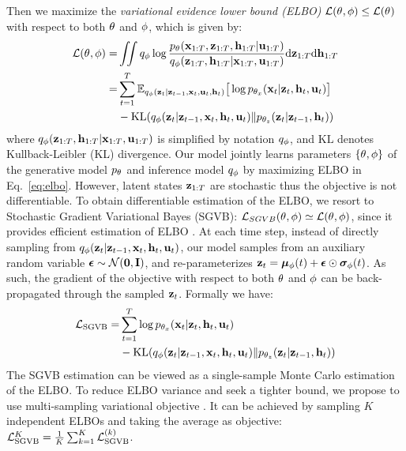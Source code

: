 \documentclass{article}
\begin{document}
Then we maximize the \textit{variational evidence lower bound (ELBO)} $\mcL(\bt, \bphi)\le\mcL(\bt)$~\cite{jordan1999introduction} with respect to both $\bt$ and $\bphi$, which is given by:
\begin{equation}\label{eq:elbo}
\begin{split}
    \mcL(\bt, \bphi) 
    =& \iint \qPhi\log
    \frac{\pT(\bx_{1:T}, \bz_{1:T}, \bh_{1:T}|\bu_{1:T})}{\qPhi(\bz_{1:T}, \bh_{1:T}|\bx_{1:T},\bu_{1:T})}\mathrm{d}\bz_{1:T}\mathrm{d}\bh_{1:T}\\
    =&\sum_{t=1}^{T}\mathbb{E}_{\qPhi(\bz_t|\bz_{t-1},\bx_t,\bu_t,\bh_t)}\big[\log \pT[x](\bx_t|\bz_t,\bh_t,\bu_t)\big]\\
    &- \text{KL}(\qPhi(\bz_t|\bz_{t-1},\bx_t,\bh_t, \bu_t)\rVert\pT[z](\bz_t|\bz_{t-1},\bh_t))
\end{split}
\end{equation}
where $\qPhi(\bz_{1:T}, \bh_{1:T}|\bx_{1:T},\bu_{1:T})$ is simplified by notation $\qPhi$, and $\text{KL}$ denotes Kullback-Leibler (KL) divergence. Our model jointly learns parameters $\{\bt, \bphi\}$ of the generative model $\pT$ and inference model $\qPhi$ by maximizing ELBO in Eq.~\ref{eq:elbo}. However, latent states $\bz_{1:T}$ are stochastic thus the objective is not differentiable. To obtain differentiable estimation of the ELBO, we resort to Stochastic Gradient Variational Bayes (SGVB): $\mcL_{SGVB}(\bt, \bphi)\simeq\mcL(\bt,\bphi)$, since it provides efficient estimation of ELBO \cite{kingma2013auto}. At each time step, instead of directly sampling from $\qPhi(\bz_t|\bz_{t-1},\bx_t,\bh_t, \bu_t)$, our model samples from an auxiliary random variable $\beps\sim\mcN(\mathbf{0},\mathbf{I})$, and re-parameterizes $\bz_t=\bmu_{\bphi}(t) + \beps\odot\bsigma_{\bphi}(t)$. As such, the gradient of the objective with respect to both $\bt$ and $\bphi$ can be back-propagated through the sampled $\bz_t$. Formally we have:
\begin{equation}
\begin{split}
    \mcL_{\text{SGVB}} = &\sum_{t=1}^{T}\log \pT[x](\bx_t|\bz_t,\bh_t,\bu_t)\\
    &- \text{KL}(\qPhi(\bz_t|\bz_{t-1},\bx_t,\bh_t, \bu_t)\rVert\pT[z](\bz_t|\bz_{t-1},\bh_t))
\end{split}
\end{equation}
The SGVB estimation can be viewed as a single-sample Monte Carlo estimation of the ELBO. To reduce ELBO variance and seek  a tighter bound, we propose to use multi-sampling variational objective \cite{mnih2016variational,burda2015importance}. It can be achieved by sampling $K$ independent ELBOs and taking the average as objective: $\mcL_{\text{SGVB}}^K = \frac{1}{K}\sum_{k=1}^K\mcL_\text{SGVB}^{(k)}$.
\end{document}
